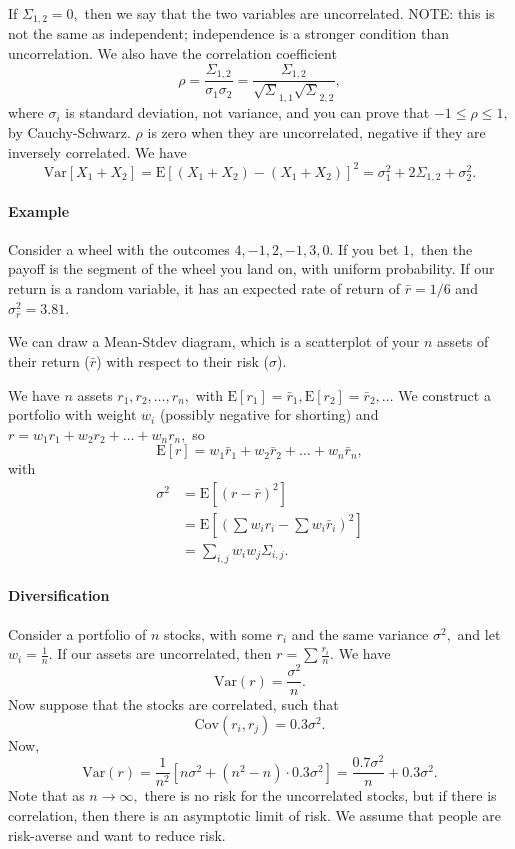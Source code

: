 \documentclass[12pt]{article}
\theoremstyle{remark}
\begin{document}
If $\Sigma_{1,2}=0,$ then we say that the two variables are uncorrelated. NOTE: this is not the same as independent; independence is a stronger condition than uncorrelation. We also have the correlation coefficient
\[\rho=\frac{\Sigma_{1,2}}{\sigma_1\sigma_2}=\frac{\Sigma_{1,2}}{\sqrt\Sigma_{1,1}\sqrt\Sigma_{2,2}},\] where $\sigma_i$ is standard deviation, not variance, and you can prove that $-1\le\rho\le 1,$ by Cauchy-Schwarz. $\rho$ is zero when they are uncorrelated, negative if they are inversely correlated. We have
\[\mathrm{Var}[X_1+X_2]=\mathrm{E}[(X_1+X_2)-(X_1+X_2)]^2=\sigma_1^2+2\Sigma_{1,2}+\sigma_2^2.\]
\paragraph{Example}
Consider a wheel with the outcomes $4,-1,2,-1,3,0.$ If you bet $1,$ then the payoff is the segment of the wheel you land on, with uniform probability. If our return is a random variable, it has an expected rate of return of $\bar{r}=1/6$ and $\sigma_{\bar{r}}^2=3.81.$

We can draw a Mean-Stdev diagram, which is a scatterplot of your $n$ assets of their return ($\bar{r}$) with respect to their risk ($\sigma$).



We have $n$ assets $r_1,r_2,\dots,r_n,$ with $\mathrm{E}[r_1]=\bar{r}_1,\mathrm{E}[r_2]=\bar{r}_2,\dots$ We construct a portfolio with weight $w_i$ (possibly negative for shorting) and $r=w_1r_1+w_2r_2+\dots+w_nr_n,$
so
\[\mathrm{E}[r] = w_1\bar{r}_1+w_2\bar{r}_2+\dots+w_n\bar{r}_n,\] with
\begin{align*}\sigma^2&=\mathrm{E}[(r-\bar{r})^2]\\&=\mathrm{E}\left[\left(\sum w_ir_i-\sum w_i\bar{r}_i\right)^2\right]\\&=\sum_{i,j}w_iw_j\Sigma_{i,j}.\end{align*}

\paragraph{Diversification}
Consider a portfolio of $n$ stocks, with some $r_i$ and the same variance $\sigma^2,$ and let $w_i=\frac{1}{n}.$ If our assets are uncorrelated, then
$r=\sum\frac{r_i}{n}.$
We have
\[\mathrm{Var}(r) = \frac{\sigma^2}{n}.\]
Now suppose that the stocks are correlated, such that
\[\mathrm{Cov}(r_i,r_j)=0.3\sigma^2.\] Now, \[\mathrm{Var}(r)=\frac{1}{n^2}\left[n\sigma^2+(n^2-n)\cdot0.3\sigma^2\right]=\frac{0.7\sigma^2}{n}+0.3\sigma^2.\] Note that as $n\to\infty,$ there is no risk for the uncorrelated stocks, but if there is correlation, then there is an asymptotic limit of risk. We assume that people are risk-averse and want to reduce risk.
\end{document}
